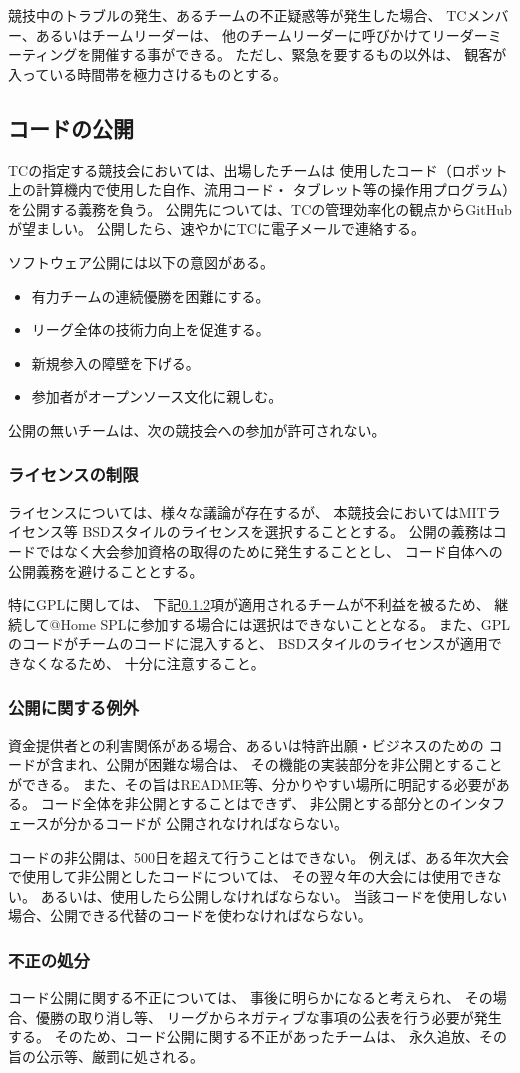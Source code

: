 \documentclass[a4j]{jarticle}
\begin{document}
競技中のトラブルの発生、あるチームの不正疑惑等が発生した場合、
TCメンバー、あるいはチームリーダーは、
他のチームリーダーに呼びかけてリーダーミーティングを開催する事ができる。
ただし、緊急を要するもの以外は、
観客が入っている時間帯を極力さけるものとする。

\subsection{コードの公開}

TCの指定する競技会においては、出場したチームは
使用したコード（ロボット上の計算機内で使用した自作、流用コード・
タブレット等の操作用プログラム）を公開する義務を負う。
公開先については、TCの管理効率化の観点からGitHubが望ましい。
公開したら、速やかにTCに電子メールで連絡する。


ソフトウェア公開には以下の意図がある。
\begin{itemize}
	\item 有力チームの連続優勝を困難にする。
	\item リーグ全体の技術力向上を促進する。
	\item 新規参入の障壁を下げる。
	\item 参加者がオープンソース文化に親しむ。
\end{itemize}
公開の無いチームは、次の競技会への参加が許可されない。

\subsubsection{ライセンスの制限}

ライセンスについては、様々な議論が存在するが、
本競技会においてはMITライセンス等
BSDスタイルのライセンスを選択することとする。
公開の義務はコードではなく大会参加資格の取得のために発生することとし、
コード自体への公開義務を避けることとする。

特にGPLに関しては、
下記\ref{sub:licence_exception}項が適用されるチームが不利益を被るため、
継続して@Home SPLに参加する場合には選択はできないこととなる。
また、GPLのコードがチームのコードに混入すると、
BSDスタイルのライセンスが適用できなくなるため、
十分に注意すること。

\subsubsection{公開に関する例外}\label{sub:licence_exception}

資金提供者との利害関係がある場合、あるいは特許出願・ビジネスのための
コードが含まれ、公開が困難な場合は、
その機能の実装部分を非公開とすることができる。
また、その旨はREADME等、分かりやすい場所に明記する必要がある。
コード全体を非公開とすることはできず、
非公開とする部分とのインタフェースが分かるコードが
公開されなければならない。


コードの非公開は、500日を超えて行うことはできない。
例えば、ある年次大会で使用して非公開としたコードについては、
その翌々年の大会には使用できない。
あるいは、使用したら公開しなければならない。
当該コードを使用しない場合、公開できる代替のコードを使わなければならない。

\subsubsection{不正の処分}


コード公開に関する不正については、
事後に明らかになると考えられ、
その場合、優勝の取り消し等、
リーグからネガティブな事項の公表を行う必要が発生する。
そのため、コード公開に関する不正があったチームは、
永久追放、その旨の公示等、厳罰に処される。

%
\end{document}
